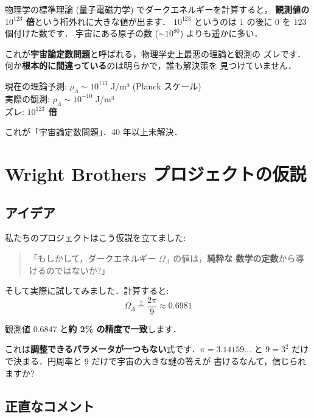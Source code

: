 \documentclass[11pt,a4paper]{article}
\begin{document}
物理学の標準理論 (量子電磁力学) でダークエネルギーを計算すると，
\textbf{観測値の $10^{123}$ 倍}という桁外れに大きな値が出ます．
$10^{123}$ というのは $1$ の後に $0$ を $123$ 個付けた数です．
宇宙にある原子の数 ($\sim 10^{80}$) よりも遥かに多い．

これが\textbf{宇宙論定数問題}と呼ばれる，物理学史上最悪の理論と観測の
ズレです．何か\textbf{根本的に間違っている}のは明らかで，誰も解決策を
見つけていません．

\begin{tcolorbox}[colback=red!5,colframe=red!50!black]
現在の理論予測: $\rho_\Lambda \sim 10^{113}$ J/m³ (Planck スケール)\\
実際の観測: $\rho_\Lambda \sim 10^{-10}$ J/m³\\
ズレ: \textbf{$10^{123}$ 倍}

これが「宇宙論定数問題」．40 年以上未解決．
\end{tcolorbox}

\section{Wright Brothers プロジェクトの仮説}

\subsection{アイデア}

私たちのプロジェクトはこう仮説を立てました:

\begin{quote}
「もしかして，ダークエネルギー $\Omega_\Lambda$ の値は，\textbf{純粋な
数学の定数}から導けるのではないか?」
\end{quote}

そして実際に試してみました．計算すると:
\begin{equation*}
\boxed{\Omega_\Lambda \stackrel{?}{=} \frac{2\pi}{9} \approx 0.6981}
\end{equation*}

観測値 $0.6847$ と\textbf{約 2\% の精度で一致}します．

これは\textbf{調整できるパラメータが一つもない}式です．$\pi = 3.14159\ldots$
と $9 = 3^2$ だけで決まる．円周率と 9 だけで宇宙の大きな謎の答えが
書けるなんて，信じられますか?

\subsection{正直なコメント}
\end{document}
